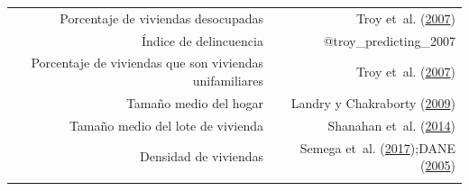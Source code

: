 \documentclass[12pt,a4paper,openany]{book}
\theoremstyle{definition}
\theoremstyle{definition}
\theoremstyle{definition}
\theoremstyle{remark}
\begin{document}
\begin{longtable}[]{@{}rr@{}}
\begin{minipage}[t]{0.57\columnwidth}\raggedleft\strut
Porcentaje de viviendas desocupadas\strut
\end{minipage} & \begin{minipage}[t]{0.31\columnwidth}\raggedleft\strut
Troy et~al. (\protect\hyperlink{ref-troy_predicting_2007}{2007})\strut
\end{minipage}\tabularnewline
\begin{minipage}[t]{0.57\columnwidth}\raggedleft\strut
Índice de delincuencia\strut
\end{minipage} & \begin{minipage}[t]{0.31\columnwidth}\raggedleft\strut
@troy\_predicting\_2007\strut
\end{minipage}\tabularnewline
\begin{minipage}[t]{0.57\columnwidth}\raggedleft\strut
Porcentaje de viviendas que son viviendas unifamiliares\strut
\end{minipage} & \begin{minipage}[t]{0.31\columnwidth}\raggedleft\strut
Troy et~al. (\protect\hyperlink{ref-troy_predicting_2007}{2007})\strut
\end{minipage}\tabularnewline
\begin{minipage}[t]{0.57\columnwidth}\raggedleft\strut
Tamaño medio del hogar\strut
\end{minipage} & \begin{minipage}[t]{0.31\columnwidth}\raggedleft\strut
Landry y Chakraborty
(\protect\hyperlink{ref-landry_street_2009}{2009})\strut
\end{minipage}\tabularnewline
\begin{minipage}[t]{0.57\columnwidth}\raggedleft\strut
Tamaño medio del lote de vivienda\strut
\end{minipage} & \begin{minipage}[t]{0.31\columnwidth}\raggedleft\strut
Shanahan et~al.
(\protect\hyperlink{ref-shanahan_socio-economic_2014}{2014})\strut
\end{minipage}\tabularnewline
\begin{minipage}[t]{0.57\columnwidth}\raggedleft\strut
Densidad de viviendas\strut
\end{minipage} & \begin{minipage}[t]{0.31\columnwidth}\raggedleft\strut
Semega et~al. (\protect\hyperlink{ref-semega2017income}{2017});DANE
(\protect\hyperlink{ref-censo_sistema_dane}{2005})\strut
\end{minipage}\tabularnewline
\begin{minipage}[t]{0.57\columnwidth}\raggedleft\strut

\end{minipage}
\end{longtable}
\end{document}
